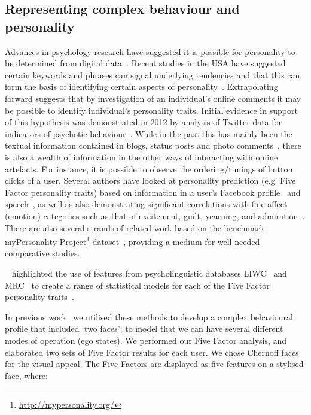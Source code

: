 \documentclass[letterpaper]{article}
\begin{document}
\subsection{Representing complex behaviour and personality}

Advances in psychology research have suggested it is possible for
personality to be determined from digital
data~\cite{pennebaker+king:1999,vazire+gosling:2004,iacobelli-et-al:2011}.
Recent studies in the USA have suggested certain keywords and phrases
can signal underlying tendencies and that this can form the basis of
identifying certain aspects of
personality~\cite{woodworth-et-al:2012}.  Extrapolating forward
suggests that by investigation of an individual's online comments it
may be possible to identify individual's personality traits. Initial
evidence in support of this hypothesis was demonstrated in 2012 by
analysis of Twitter data for indicators of psychotic
behaviour~\cite{sumner-et-al:2012}. While in the past this has mainly
been the textual information contained in blogs, status posts and
photo comments~\cite{blamey-et-al-2012}, there is also a wealth of
information in the other ways of interacting with online
artefacts. For instance, it is possible to observe the
ordering/timings of button clicks of a user. Several authors have
looked at personality prediction (e.g. Five Factor personality traits)
based on information in a user's Facebook
profile~\cite{back-et-al:2010,golbeck-et-al:2001} and
speech~\cite{chung+pennebaker:2007,tausczik+pennebaker:2010}, as well
as also demonstrating significant correlations with fine affect
(emotion) categories such as that of excitement, guilt, yearning, and
admiration~\cite{mohammad+kiritchenko:2013}. There are also several
strands of related work based on the benchmark myPersonality
Project\footnote{\url{http://mypersonality.org/}}
dataset~\cite{celli-et-al:2013}, providing a medium for well-needed
comparative studies.

\citeauthor{mairesse-et-al:2007}~
highlighted the use of features from psycholinguistic databases
LIWC~\cite{pennebaker-et-al:2001} and MRC~\cite{wilson:1988} to create
a range of statistical models for each of the Five Factor personality
traits~\cite{norman:1963,peabody+goldberg:1989}.

In previous work~\cite{oatley+crick:2014} we utilised these methods to
develop a complex behavioural profile that included `two faces'; to
model that we can have several different modes of operation (ego
states). We performed our Five Factor analysis, and elaborated two
sets of Five Factor results for each user. We chose Chernoff
faces~\cite{chernoff:1973} for the visual appeal. The Five Factors are displayed as five
features on a stylised face, where:
\end{document}
